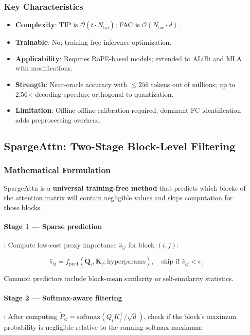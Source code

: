 \documentclass[11pt,a4paper]{article}
\begin{document}
\subsubsection{Key Characteristics}

\begin{itemize}[leftmargin=*]
    \item \textbf{Complexity}: TIP is $\mathcal{O}(t \cdot N_{\text{tip}})$; FAC is $\mathcal{O}(N_{\text{fac}} \cdot d)$.
    \item \textbf{Trainable}: No; training-free inference optimization.
    \item \textbf{Applicability}: Requires RoPE-based models; extended to ALiBi and MLA with modifications.
    \item \textbf{Strength}: Near-oracle accuracy with $\leq 256$ tokens out of millions; up to 2.56$\times$ decoding speedup; orthogonal to quantization.
    \item \textbf{Limitation}: Offline offline calibration required; dominant FC identification adds preprocessing overhead.
\end{itemize}

\subsection{SpargeAttn: Two-Stage Block-Level Filtering}

\subsubsection{Mathematical Formulation}

SpargeAttn \citep{zhang_spargeattn_2025} is a \textbf{universal training-free method} that predicts which blocks of the attention matrix will contain negligible values and skips computation for those blocks.

\paragraph{Stage 1 --- Sparse prediction}: Compute low-cost proxy importance $\hat{s}_{ij}$ for block $(i,j)$:

\[
\hat{s}_{ij} = f_{\text{pred}}(\mathbf{Q}_i, \mathbf{K}_j; \text{hyperparams}), \quad \text{skip if } \hat{s}_{ij} < \epsilon_1
\]

Common predictors include block-mean similarity or self-similarity statistics.

\paragraph{Stage 2 --- Softmax-aware filtering}: After computing $\tilde{P}_{ij} = \text{softmax}(Q_i K_j^\top/\sqrt{d})$, check if the block's maximum probability is negligible relative to the running softmax maximum:
\end{document}
